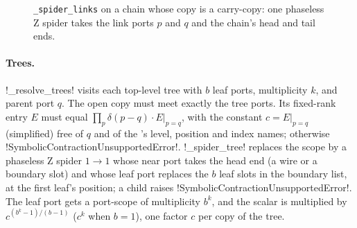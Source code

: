 \begin{figure}[H]
\centering
{}
\caption{\texttt{\_spider\_links} on a chain whose copy is a carry-copy: one phaseless Z spider takes the link ports $p$ and $q$ and the chain's head and tail ends.}\label{fig:semantics-chain-spider}
\end{figure}

\paragraph{Trees.} \py!_resolve_trees! visits each top-level tree \bbox{} with $b$ leaf ports, multiplicity $k$, and parent port $q$. The open copy must meet exactly the tree ports. Its fixed-rank entry $E$ must equal $\prod_{p}\delta(p-q)\cdot E|_{p=q}$, with the constant $c=E|_{p=q}$ (simplified) free of $q$ and of the \bbox{}'s level, position and index names; otherwise \py!SymbolicContractionUnsupportedError!. \py!_spider_tree! replaces the scope by a phaseless Z spider $1\to1$ whose near port takes the head end (a wire or a boundary slot) and whose leaf port replaces the $b$ leaf slots in the boundary list, at the first leaf's position; a child \bbox{} raises \py!SymbolicContractionUnsupportedError!. The leaf port gets a port-scope \bbox{} of multiplicity $b^k$, and the scalar is multiplied by $c^{(b^k-1)/(b-1)}$ ($c^k$ when $b=1$), one factor $c$ per copy of the tree.

